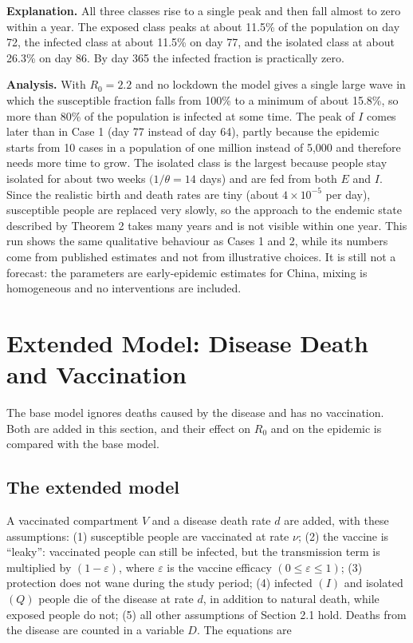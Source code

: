 \documentclass[12pt,a4paper]{article}
\theoremstyle{definition}
\begin{document}
\textbf{Explanation. }All three classes rise to a single peak and then fall almost to zero within a year. The exposed class peaks at about 11.5\% of the population on day 72, the infected class at about 11.5\% on day 77, and the isolated class at about 26.3\% on day 86. By day 365 the infected fraction is practically zero.


\textbf{Analysis. }With $R_{0} = 2.2$ and no lockdown the model gives a single large wave in which the susceptible fraction falls from 100\% to a minimum of about 15.8\%, so more than 80\% of the population is infected at some time. The peak of $I$ comes later than in Case 1 (day 77 instead of day 64), partly because the epidemic starts from 10 cases in a population of one million instead of 5,000 and therefore needs more time to grow. The isolated class is the largest because people stay isolated for about two weeks $(1/\theta = 14$ days) and are fed from both $E$ and $I$. Since the realistic birth and death rates are tiny (about $4 \times 10^{-5}$ per day), susceptible people are replaced very slowly, so the approach to the endemic state described by Theorem 2 takes many years and is not visible within one year. This run shows the same qualitative behaviour as Cases 1 and 2, while its numbers come from published estimates and not from illustrative choices. It is still not a forecast: the parameters are early-epidemic estimates for China, mixing is homogeneous and no interventions are included.


\section{Extended Model: Disease Death and Vaccination}

The base model ignores deaths caused by the disease and has no vaccination. Both are added in this section, and their effect on $R_{0}$ and on the epidemic is compared with the base model.


\subsection{The extended model}

A vaccinated compartment $V$ and a disease death rate $d$ are added, with these assumptions: (1) susceptible people are vaccinated at rate $\nu$; (2) the vaccine is “leaky”: vaccinated people can still be infected, but the transmission term is multiplied by $(1 - \varepsilon )$, where $\varepsilon$ is the vaccine efficacy $(0 \le \varepsilon \le 1)$; (3) protection does not wane during the study period; (4) infected $(I)$ and isolated $(Q)$ people die of the disease at rate $d$, in addition to natural death, while exposed people do not; (5) all other assumptions of Section 2.1 hold. Deaths from the disease are counted in a variable $D$. The equations are
\end{document}
